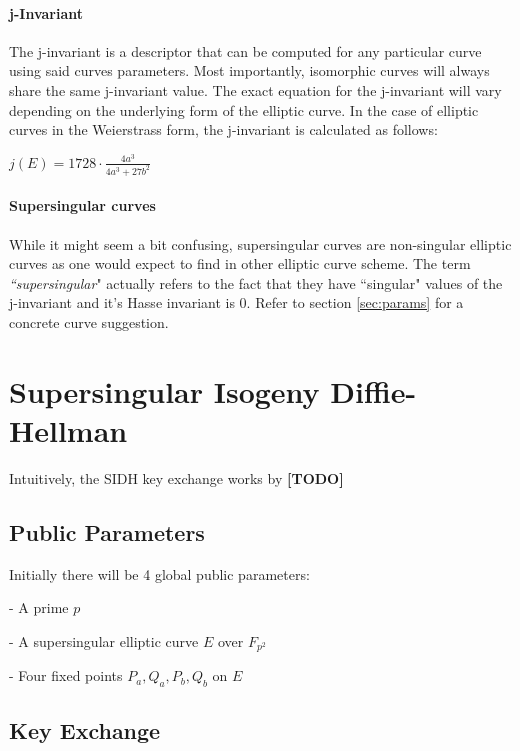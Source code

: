 \documentclass[10pt,twocolumn]{article} %
\begin{document}
\paragraph{j-Invariant}
The j-invariant is a descriptor that can be computed for any particular curve using said curves parameters. Most importantly, isomorphic curves will always share the same j-invariant value. The exact equation for the j-invariant will vary depending on the underlying form of the elliptic curve. In the case of elliptic curves in the Weierstrass form, the j-invariant is calculated as follows:

\begin{center}
	\centering
	$j(E)=1728\cdot\frac{4a^3}{4a^3+27b^2}$
\end{center}


\paragraph{Supersingular curves} While it might seem a bit confusing, supersingular curves are non-singular elliptic curves as one would expect to find in other elliptic curve scheme. The term \textit{``supersingular}" actually refers to the fact that they have ``singular" values of the j-invariant and it's Hasse invariant is 0. Refer to section \ref{sec:params} for a concrete curve suggestion.

\section{Supersingular Isogeny Diffie-Hellman}
Intuitively, the SIDH key exchange works by \textbf{[TODO]}

\subsection{Public Parameters}
Initially there will be 4 global public parameters:
\par - A prime $p$ 
\par - A supersingular elliptic curve $E$ over $F_{p^2}$
\par - Four fixed points $P_a,Q_a,P_b,Q_b$ on $E$ 

\subsection{Key Exchange}
\end{document}
